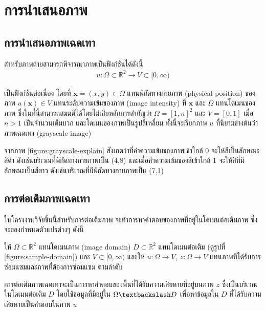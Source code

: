 \section{การนำเสนอภาพ}
\subsection{การนำเสนอภาพเฉดเทา}

\hspace{1cm} สำหรับภาพถ่ายสามารถพิจารณาภาพเป็นฟังก์ชันได้ดังนี้
\begin{align*}
    u : \Omega \subset \mathbb{R}^2 \rightarrow V \subset [0,\infty)	
\end{align*}

 เป็นฟังก์ชันต่อเนื่อง โดยที่ $ \mathbf{x} = (x,y) \in \Omega $ แทนพิกัดทางกายภาพ (physical position) ของภาพ $ u(\mathbf{x}) \in V $ แทนระดับความเข้มของภาพ (image intensity) ที่ $ \mathbf{x} $ และ $ \Omega $ แทนโดเมนของภาพ ซึ่งในที่นี้สามารถสมมติได้โดยไม่เสียหลักการสำคัญว่า $ \Omega = [1,n]^2 $ และ $ V = [0,1] $ เมื่อ $n>1$ เป็นจำนวนเต็มบวก และโดเมนของภาพเป็นรูปสี่เหลี่ยม ทั้งนี้จะเรียกภาพ $u$ ที่นิยามข้างต้นว่าภาพเฉดเทา (grayscale image)



\hspace{1cm} จากภาพ \ref{figure:grayscale-explain} สังเกตว่าที่ค่าความเข้มของภาพเข้าใกล้ 0 จะให้สีเป็นลักษณะสีดำ ดังเช่นบริเวณที่พิกัดทางกายภาพเป็น (4,8) และเมื่อค่าความเข้มของสีเข้าใกล้ 1 จะให้สีที่มีลักษณะเป็นสีขาว ดังเช่นบริเวณที่มีพิกัดทางกายภาพเป็น (7,1)

\subsection{การต่อเติมภาพเฉดเทา}
\hspace{1cm} ในโครงงานวิจัยชิ้นนี้สำหรับการต่อเติมภาพ จะทำการหาคำตอบของภาพที่อยู่ในโดเมนต่อเติมภาพ ซึ่งจะของกำหนดตัวแปรต่างๆ ดังนี้

\hspace{1cm} ให้ $\Omega \subset \mathbb{R}^2$ แทนโดเมนภาพ (image domain) $D \subset \mathbb{R}^2$ แทนโดเมนต่อเติม (ดูรูปที่ \ref{figure:sample-domain}) และ $V \subset [0,\infty)$ และให้ $ u: \Omega \rightarrow V,\ z: \Omega \rightarrow V$ แทนภาพที่ได้รับการซ่อมแซมและภาพที่ต้องการซ่อมแซม ตามลำดับ



\hspace{1cm} การต่อเติมภาพเฉดเทาจะเป็นการหาคำตอบของพื้นที่ได้รับความเสียหายที่อยู่บนภาพ $z$ ซึ่งเป็นบริเวณในโดเมนต่อเติม $D$ โดยใช้ข้อมูลที่มีอยู่ใน $\Omega \textbackslash D$ เพื่อหาข้อมูลใน $D$ ที่ได้รับความเสียหายเป็นคำตอบในภาพ $u$


